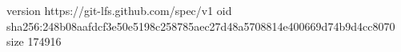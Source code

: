 version https://git-lfs.github.com/spec/v1
oid sha256:248b08aafdcf3e50e5198c258785aec27d48a5708814e400669d74b9d4cc8070
size 174916
